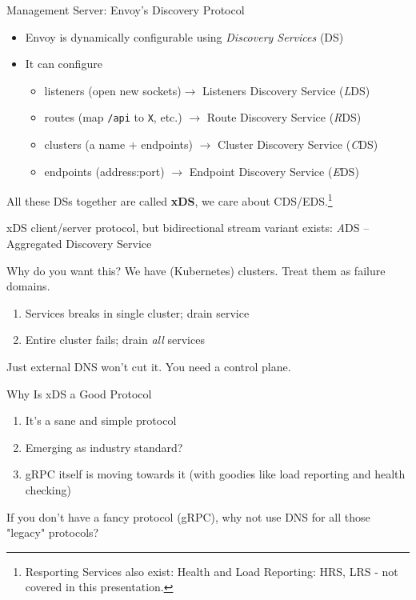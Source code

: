 \documentclass[aspectratio=169]{beamer}
\begin{document}
    \begin{frame}{Management Server: Envoy's Discovery Protocol}
        \begin{itemize}
            \item Envoy is dynamically configurable using \emph{Discovery Services} (DS)
            \item It can configure
            \begin{itemize}
                \item listeners (open new sockets)$\rightarrow$ Listeners Discovery Service (\emph{L}DS)
                \item routes (map \texttt{/api} to \texttt{X}, etc.) $\rightarrow$ Route Discovery Service (\emph{R}DS)
                \item clusters (a name + endpoints) $\rightarrow$ Cluster Discovery Service (\emph{C}DS)
                \item endpoints (address:port) $\rightarrow$ Endpoint Discovery Service (\emph{E}DS)
            \end{itemize}
        \end{itemize}

        All these DSs together are called {\bf xDS}, we care about CDS/EDS.\footnote{Resporting Services also exist: Health and Load
        Reporting: HRS, LRS - not covered in this presentation.}

        xDS client/server protocol, but bidirectional stream variant exists: \emph{A}DS -- Aggregated Discovery Service
    \end{frame}

    \begin{frame}{Why do you want this?}
        We have (Kubernetes) clusters. Treat them as failure domains.
        \begin{enumerate}
            \item Services breaks in single cluster; drain service
            \item Entire cluster fails; drain \emph{all} services
        \end{enumerate}
        Just external DNS won't cut it. You need a control plane.
    \end{frame}

    \begin{frame}{Why Is xDS a Good Protocol}
        \begin{enumerate}
            \item It's a sane and simple protocol
            \item Emerging as industry standard?
            \item gRPC itself is moving towards it (with goodies like load reporting and health checking)
        \end{enumerate}
        If you don't have a fancy protocol (gRPC), why not use DNS for all those "legacy" protocols?
    \end{frame}
\end{document}
